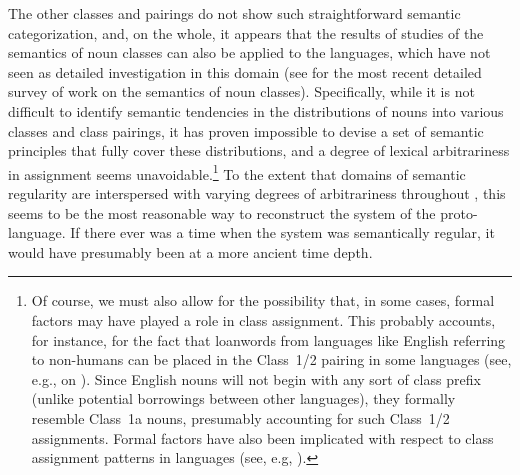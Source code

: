 \documentclass[output=paper ,collection	  ,collectionchapter ,biblatexbackend=biber   ]{langscibook}
\begin{document}
\largerpage
The other classes and pairings do not show such straightforward semantic
categorization, and, on the whole, it appears that the results of studies of the
semantics of  noun classes can also be applied to the 
languages, which have not seen as detailed investigation in this domain (see
 for the most recent detailed survey of work on the
semantics of  noun classes). Specifically, while it is
not difficult to identify semantic tendencies in the distributions of nouns into
various classes and class pairings, it has proven impossible to devise a set of
semantic principles that fully cover these distributions, and a degree of
lexical arbitrariness in assignment seems unavoidable.{\footnote{Of course, we
must also allow for the possibility that, in some cases, formal factors may have
played a role in class assignment. This probably accounts, for instance, for the
fact that loanwords from languages like English referring to non-humans can be
placed in the Class~1/2 pairing in some  languages (see,
e.g.,  on ). Since English nouns
will not begin with any sort of class prefix (unlike potential borrowings
between other  languages), they formally resemble Class~1a
nouns, presumably accounting for such Class~1/2 assignments. Formal factors have
also been implicated with respect to class assignment patterns in 
languages (see, e.g, ).}} To the extent that
domains of semantic regularity are interspersed with varying degrees of
arbitrariness throughout , this seems to be the most
reasonable way to reconstruct the system of the proto-language. If there ever
was a time when the system was semantically regular, it would have presumably
been at a more ancient time depth.
\end{document}

